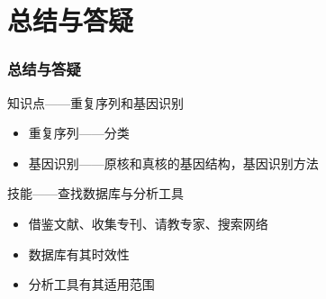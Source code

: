 \section{总结与答疑}
\begin{frame}
  \frametitle{总结与答疑}
  \begin{block}{知识点——重复序列和基因识别}
    \begin{itemize}
      \item 重复序列——分类
      \item 基因识别——原核和真核的基因结构，基因识别方法
    \end{itemize}
  \end{block}
  \begin{block}{技能——查找数据库与分析工具}
    \begin{itemize}
      \item 借鉴文献、收集专刊、请教专家、搜索网络
      \item 数据库有其时效性
      \item 分析工具有其适用范围
    \end{itemize}
  \end{block}
\end{frame}
